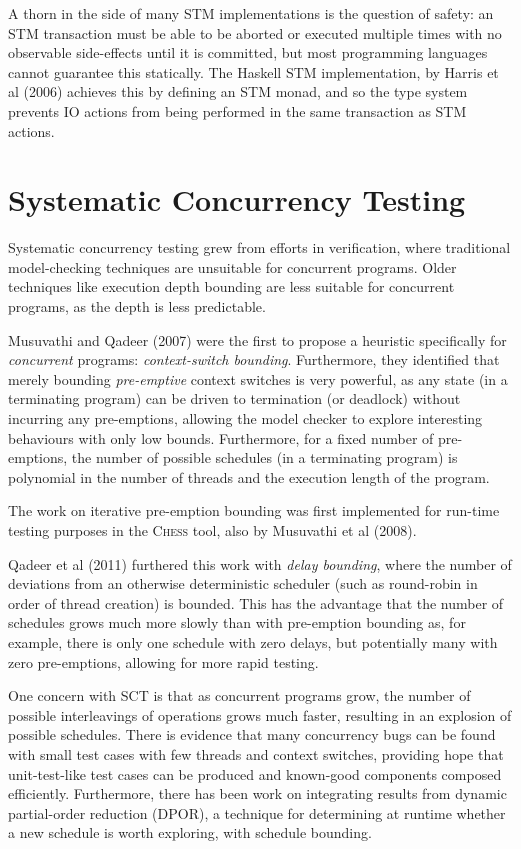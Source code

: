 A thorn in the side of many STM implementations is the question of
safety: an STM transaction must be able to be aborted or executed
multiple times with no observable side-effects until it is committed,
but most programming languages cannot guarantee this statically. The
Haskell STM implementation, by Harris et al (2006)\nocite{haskellstm}
achieves this by defining an STM monad, and so the type system
prevents IO actions from being performed in the same transaction as
STM actions.

\section{Systematic Concurrency Testing}
\label{sec:litrev-sct}

Systematic concurrency testing grew from efforts in
verification\cite{pbound}, where traditional model-checking techniques
are unsuitable for concurrent programs. Older techniques like
execution depth bounding are less suitable for concurrent programs, as
the depth is less predictable.

Musuvathi and Qadeer (2007) were the first to propose a heuristic
specifically for \textit{concurrent} programs: \textit{context-switch
  bounding}. Furthermore, they identified that merely bounding
\textit{pre-emptive} context switches is very powerful, as any state
(in a terminating program) can be driven to termination (or deadlock)
without incurring any pre-emptions, allowing the model checker to
explore interesting behaviours with only low bounds. Furthermore, for
a fixed number of pre-emptions, the number of possible schedules (in a
terminating program) is polynomial in the number of threads and the
execution length of the program.

The work on iterative pre-emption bounding was first implemented for
run-time testing purposes in the \textsc{Chess}\cite{heisenbugs} tool,
also by Musuvathi et al (2008).

Qadeer et al (2011) furthered this work with \textit{delay bounding},
where the number of deviations from an otherwise deterministic
scheduler (such as round-robin in order of thread creation) is
bounded. This has the advantage that the number of schedules grows
much more slowly than with pre-emption bounding as, for example, there
is only one schedule with zero delays, but potentially many with zero
pre-emptions, allowing for more rapid testing.

One concern with SCT is that as concurrent programs grow, the number
of possible interleavings of operations grows much faster, resulting
in an explosion of possible schedules. There is evidence that many
concurrency bugs can be found with small test cases with few threads
and context switches\cite{pbound, dbound, empirical}, providing hope
that unit-test-like test cases can be produced and known-good
components composed efficiently. Furthermore, there has been work on
integrating results from dynamic partial-order reduction (DPOR), a
technique for determining at runtime whether a new schedule is worth
exploring, with schedule bounding\cite{bpor}.

